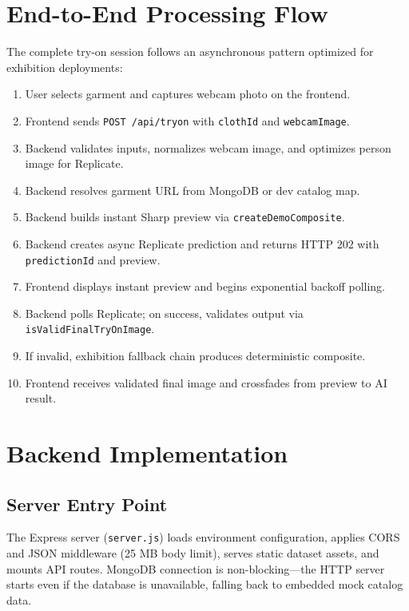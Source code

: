 \section{End-to-End Processing Flow}
\label{sec:processing-flow}

The complete try-on session follows an asynchronous pattern optimized for exhibition deployments:

\begin{enumerate}[leftmargin=*]
  \item User selects garment and captures webcam photo on the frontend.
  \item Frontend sends \texttt{POST /api/tryon} with \texttt{clothId} and \texttt{webcamImage}.
  \item Backend validates inputs, normalizes webcam image, and optimizes person image for Replicate.
  \item Backend resolves garment URL from MongoDB or dev catalog map.
  \item Backend builds instant Sharp preview via \texttt{createDemoComposite}.
  \item Backend creates async Replicate prediction and returns HTTP 202 with \texttt{predictionId} and preview.
  \item Frontend displays instant preview and begins exponential backoff polling.
  \item Backend polls Replicate; on success, validates output via \texttt{isValidFinalTryOnImage}.
  \item If invalid, exhibition fallback chain produces deterministic composite.
  \item Frontend receives validated final image and crossfades from preview to AI result.
\end{enumerate}

\section{Backend Implementation}
\label{sec:backend-implementation}

\subsection{Server Entry Point}

The Express server (\texttt{server.js}) loads environment configuration, applies CORS and JSON middleware (25 MB body limit), serves static dataset assets, and mounts API routes. MongoDB connection is non-blocking---the HTTP server starts even if the database is unavailable, falling back to embedded mock catalog data.

